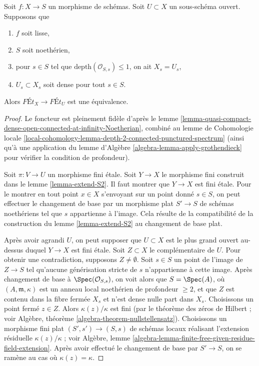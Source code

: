 \begin{lemma}
\label{lemma-purity-smooth-over-depth2}
Soit $f : X \to S$ un morphisme de schémas. Soit $U \subset X$
un sous-schéma ouvert. Supposons que
\begin{enumerate}
\item $f$ soit lisse,
\item $S$ soit noethérien,
\item pour $s \in S$ tel que $\text{depth}(\mathcal{O}_{S, s}) \leq 1$,
on ait $X_s = U_s$,
\item $U_s \subset X_s$ soit dense pour tout $s \in S$.
\end{enumerate}
Alors $\textit{F\'Et}_X \to \textit{F\'Et}_U$ est une équivalence.
\end{lemma}

\begin{proof}
Le foncteur est pleinement fidèle d'après le
lemme \ref{lemma-quasi-compact-dense-open-connected-at-infinity-Noetherian},
combiné au lemme de Cohomologie locale
\ref{local-cohomology-lemma-depth-2-connected-punctured-spectrum}
(ainsi qu'à une application du
lemme d'Algèbre \ref{algebra-lemma-apply-grothendieck}
pour vérifier la condition de profondeur).

\medskip\noindent
Soit $\pi : V \to U$ un morphisme fini étale. Soit $Y \to X$
le morphisme fini construit dans le lemme \ref{lemma-extend-S2}.
Il faut montrer que $Y \to X$ est fini étale.
Pour le montrer en tout point $x \in X$ s'envoyant sur un
point donné $s \in S$, on peut effectuer le changement de base par un morphisme plat
$S' \to S$ de schémas noethériens tel que $s$ appartienne
à l'image. Cela résulte de la compatibilité de la
construction du lemme \ref{lemma-extend-S2} au changement de base plat.

\medskip\noindent
Après avoir agrandi $U$, on peut supposer que $U \subset X$ est
le plus grand ouvert au-dessus duquel $Y \to X$ est fini étale.
Soit $Z \subset X$ le complémentaire de $U$.
Pour obtenir une contradiction, supposons $Z \not = \emptyset$.
Soit $s \in S$ un point de l'image de $Z \to S$
tel qu'aucune générisation stricte de $s$ n'appartienne à cette image.
Après changement de base à $\Spec(\mathcal{O}_{S, s})$,
on voit alors que $S = \Spec(A)$, où $(A, \mathfrak m, \kappa)$ est
un anneau local noethérien de profondeur $\geq 2$, et que $Z$ est
contenu dans la fibre fermée $X_s$
et n'est dense nulle part dans $X_s$. Choisissons un point fermé $z \in Z$.
Alors $\kappa(z)/\kappa$ est fini (par le théorème des zéros de Hilbert ; voir
Algèbre, théorème \ref{algebra-theorem-nullstellensatz}).
Choisissons un morphisme fini plat $(S', s') \to (S, s)$ de schémas locaux
réalisant l'extension résiduelle $\kappa(z)/\kappa$ ; voir
Algèbre, lemme \ref{algebra-lemma-finite-free-given-residue-field-extension}.
Après avoir effectué le changement de base par $S' \to S$, on se ramène au cas
où $\kappa(z) = \kappa$.


\end{proof}
